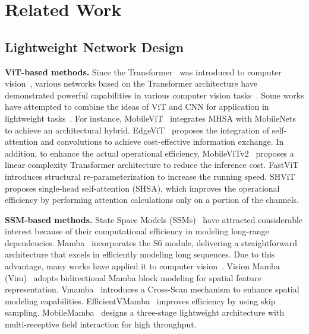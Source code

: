 \documentclass[a4paper,fleqn]{cas-dc}
\begin{document}
\section{Related Work}

\subsection{Lightweight Network Design}

\textbf{ViT-based methods.}
Since the Transformer~\cite{vaswani2017attention} was introduced to computer vision~\cite{dosovitskiy2020image}, various networks based on the Transformer architecture have demonstrated powerful capabilities in various computer vision tasks~\cite{esser2021taming,zhang2022topformer,liu2021swin}. Some works have attempted to combine the ideas of ViT and CNN for application in lightweight tasks~\cite{li2022efficientformer,mehta2022separable,vasu2023fastvit,wang2025cait}. For instance, MobileViT~\cite{mehta2021mobilevit} integrates MHSA with MobileNets to achieve an architectural hybrid. EdgeViT~\cite{pan2022edgevits} proposes the integration of self-attention and convolutions to achieve cost-effective information exchange. In addition, to enhance the actual operational efficiency, MobileViTv2~\cite{mehta2022separable} proposes a linear complexity Transformer architecture to reduce the inference cost. FastViT~\cite{vasu2023fastvit} introduces structural re-parameterization to increase the running speed. SHViT~\cite{yun2024shvit} proposes single-head self-attention (SHSA), which improves the operational efficiency by performing attention calculations only on a portion of the channels.

\textbf{SSM-based methods.}
State Space Models (SSMs)~\cite{fu2022hungry,gu2021efficiently,smith2022simplified} have attracted considerable interest because of their computational efficiency in modeling long-range dependencies. Mamba~\cite{gu2024mamba} incorporates the S6 module, delivering a straightforward architecture that excels in efficiently modeling long sequences. Due to this advantage, many works have applied it to computer vision~\cite{hatamizadeh2407mambavision,he2024mambaad,liu2024vmamba,zhu2024vision}. Vision Mamba (Vim)~\cite{zhu2024vision} adopts bidirectional Mamba block modeling for spatial feature representation. Vmamba~\cite{liu2024vmamba} introduces a Cross-Scan mechanism to enhance spatial modeling capabilities. EfficientVMamba~\cite{pei2025efficientvmamba} improves efficiency by using skip sampling. MobileMamba~\cite{he2025mobilemamba} designs a three-stage lightweight architecture with multi-receptive field interaction for high throughput.
\end{document}
